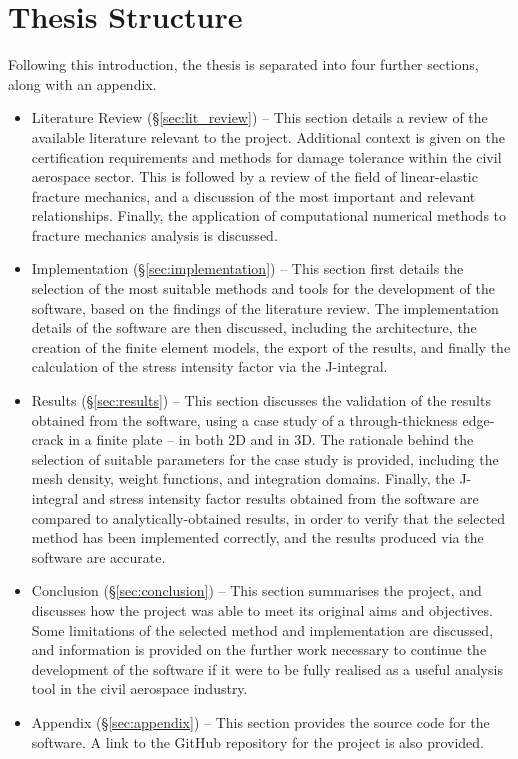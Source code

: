 \newpage
\section{Thesis Structure}

Following this introduction, the thesis is separated into four further sections, along with an appendix.

\begin{itemize}
	
	\item Literature Review (§\ref{sec:lit_review}) -- This section details a review of the available literature relevant to the project. Additional context is given on the certification requirements and methods for damage tolerance within the civil aerospace sector. This is followed by a review of the field of linear-elastic fracture mechanics, and a discussion of the most important and relevant relationships. Finally, the application of computational numerical methods to fracture mechanics analysis is discussed.
	
	\item Implementation (§\ref{sec:implementation}) -- This section first details the selection of the most suitable methods and tools for the development of the software, based on the findings of the literature review. The implementation details of the software are then discussed, including the architecture, the creation of the finite element models, the export of the results, and finally the calculation of the stress intensity factor via the J-integral.
	
	\item Results (§\ref{sec:results}) -- This section discusses the validation of the results obtained from the software, using a case study of a through-thickness edge-crack in a finite plate -- in both 2D and in 3D. The rationale behind the selection of suitable parameters for the case study is provided, including the mesh density, weight functions, and integration domains. Finally, the J-integral and stress intensity factor results obtained from the software are compared to analytically-obtained results, in order to verify that the selected method has been implemented correctly, and the results produced via the software are accurate.
	
	\item Conclusion (§\ref{sec:conclusion}) -- This section summarises the project, and discusses how the project was able to meet its original aims and objectives. Some limitations of the selected method and implementation are discussed, and information is provided on the further work necessary to continue the development of the software if it were to be fully realised as a useful analysis tool in the civil aerospace industry.
	
	\item Appendix (§\ref{sec:appendix}) -- This section provides the source code for the software. A link to the GitHub repository for the project is also provided.
	
\end{itemize}